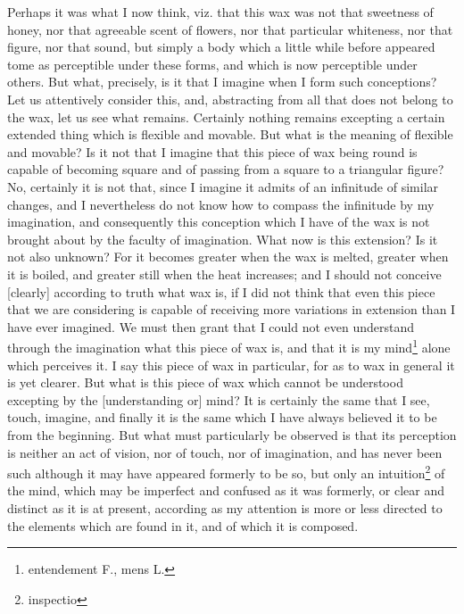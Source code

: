 Perhaps it was what I now think, viz. that this wax was not that
sweetness of honey, nor that agreeable scent of flowers, nor that
particular whiteness, nor that figure, nor that sound, but simply a
body which a little while before appeared tome as perceptible under
these forms, and which is now perceptible under others. But what,
precisely, is it that I imagine when I form such conceptions? Let us
attentively consider this, and, abstracting from all that does not
belong to the wax, let us see what remains. Certainly nothing remains
excepting a certain extended thing which is flexible and movable. But
what is the meaning of flexible and movable? Is it not that I imagine
that this piece of wax being round is capable of  becoming
square and of passing from a square to a triangular figure? No,
certainly it is not that, since I imagine it admits of an infinitude
of similar changes, and I nevertheless do not know how to compass
the infinitude by my imagination, and consequently this conception
which I have of the wax is not brought about by the faculty of
imagination. What now is this extension? Is it not also unknown? For
it becomes greater when the wax is melted, greater when it is boiled,
and greater still when the heat increases; and I should not conceive
[clearly] according to truth what wax is, if I did not think that even
this piece that we are considering is capable of receiving more
variations in extension than I have ever imagined. We must then grant
that I could not even understand through the imagination what this
piece of wax is, and that it is my mind\footnote{entendement F., mens
L.} alone which perceives it. I say this piece of wax in particular,
for as to wax in general it is yet clearer. But what is this piece of
wax which cannot be understood excepting by the [understanding or]
mind? It is certainly the same that I see, touch, imagine, and finally
it is the same which I have always believed it to be from the
beginning. But what must particularly be observed is that its
perception is neither an act of vision, nor of touch, nor of
imagination, and has never been such although it may have appeared
formerly to be so, but only an intuition\footnote{inspectio} of the
mind, which may be imperfect and confused as it was formerly, or clear
and distinct as it is at present, according as my attention is more or
less directed to the elements which are found in it, and of which it
is composed.


